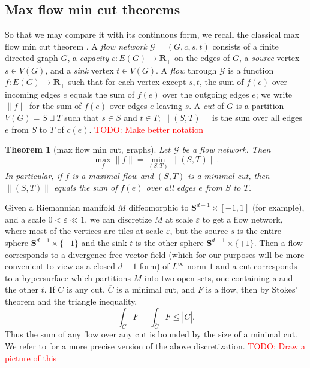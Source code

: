 \documentclass[reqno,11pt]{amsart}
\newcommand{\RR}{\mathbf{R}}
\newcommand{\Sph}{\mathbf S}
\newcommand{\dfn}[1]{\emph{#1}\index{#1}}
\newtheorem{theorem}{Theorem}[section]
\theoremstyle{definition}
\numberwithin{equation}{section}
\newcommand\todo[1]{\textcolor{red}{TODO: #1}}
\begin{document}
\subsection{Max flow min cut theorems}
So that we may compare it with its continuous form, we recall the classical max flow min cut theorem \cite[Chapter 7]{umesh2006algorithms}.
A \dfn{flow network} $\mathcal G = (G, c, s, t)$ consists of a finite directed graph $G$, a \dfn{capacity} $c: E(G) \to \RR_+$ on the edges of $G$, a \dfn{source} vertex $s \in V(G)$, and a \dfn{sink} vertex $t \in V(G)$.
A \dfn{flow} through $\mathcal G$ is a function $f: E(G) \to \RR_+$ such that for each vertex except $s, t$, the sum of $f(e)$ over incoming edges $e$ equals the sum of $f(e)$ over the outgoing edges $e$; we write $\|f\|$ for the sum of $f(e)$ over edges $e$ leaving $s$.
A \dfn{cut} of $G$ is a partition $V(G) = S \sqcup T$ such that $s \in S$ and $t \in T$; $\|(S, T)\|$ is the sum over all edges $e$ from $S$ to $T$ of $c(e)$. \todo{Make better notation}

\begin{theorem}[max flow min cut, graphs]
Let $\mathcal G$ be a flow network. Then 
$$\max_f \|f\| = \min_{(S, T)} \|(S, T)\|.$$
In particular, if $f$ is a maximal flow and $(S, T)$ is a minimal cut, then $\|(S, T)\|$ equals the sum of $f(e)$ over all edges $e$ from $S$ to $T$.
\end{theorem}

Given a Riemannian manifold $M$ diffeomorphic to $\Sph^{d - 1} \times [-1, 1]$ (for example), and a scale $0 < \varepsilon \ll 1$, we can discretize $M$ at scale $\varepsilon$ to get a flow network, where most of the vertices are tiles at scale $\varepsilon$, but the source $s$ is the entire sphere $\Sph^{d - 1} \times \{-1\}$ and the sink $t$ is the other sphere $\Sph^{d - 1} \times \{+1\}$.
Then a flow corresponds to a divergence-free vector field (which for our purposes will be more convenient to view as a closed $d - 1$-form) of $L^\infty$ norm $1$ and a cut corresponds to a hypersurface which partitions $M$ into two open sets, one containing $s$ and the other $t$.
If $C$ is any cut, $\overline C$ is a minimal cut, and $F$ is a flow, then by Stokes' theorem and the triangle inequality,
\begin{equation}\label{one sided max flow min cut}
\int_C F = \int_{\overline C} F \leq |\overline C|.
\end{equation}
Thus the sum of any flow over any cut is bounded by the size of a minimal cut.
We refer to \cite[Appendix A]{Freedman_2016} for a more precise version of the above discretization.
\todo{Draw a picture of this}
\end{document}
